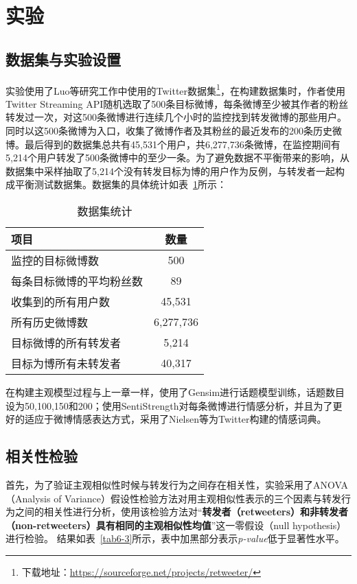 \section{实验}
\label{experiments}

\subsection{数据集与实验设置}
实验使用了Luo等研究工作中使用的Twitter数据集\footnote{下载地址：\url{https://sourceforge.net/projects/retweeter/}}，在构建数据集时，作者使用Twitter Streaming API随机选取了500条目标微博，每条微博至少被其作者的粉丝转发过一次，对这500条微博进行连续几个小时的监控找到转发微博的那些用户。同时以这500条微博为入口，收集了微博作者及其粉丝的最近发布的200条历史微博。最后得到的数据集总共有45,531个用户，共6,277,736条微博，在监控期间有5,214个用户转发了500条微博中的至少一条。为了避免数据不平衡带来的影响，从数据集中采样抽取了5,214个没有转发目标为博的用户作为反例，与转发者一起构成平衡测试数据集。数据集的具体统计如表~\ref{tab6-2}所示：
\begin{table}[htb]
\centering
\caption{数据集统计}
\label{tab6-2}
\begin{tabular}{|l|c|}
\hline
项目 &数量\\
\hline
监控的目标微博数 & 500 \\
\hline
每条目标微博的平均粉丝数 & 89 \\
\hline
收集到的所有用户数 & 45,531 \\
\hline
所有历史微博数 & 6,277,736 \\
\hline
目标微博的所有转发者 & 5,214 \\
\hline
目标为博所有未转发者 & 40,317  \\
\hline
\end{tabular}
\end{table}

在构建主观模型过程与上一章一样，使用了Gensim进行话题模型训练，话题数目设为50,100,150和200；使用SentiStrength对每条微博进行情感分析，并且为了更好的适应于微博情感表达方式，采用了Nielsen等为Twitter构建的情感词典。

\subsection{相关性检验}
首先，为了验证主观相似性时候与转发行为之间存在相关性，实验采用了ANOVA（Analysis of Variance）假设性检验方法对用主观相似性表示的三个因素与转发行为之间的相关性进行分析，使用该检验方法对“\textbf{转发者（retweeters）和非转发者（non-retweeters）具有相同的主观相似性均值}”这一零假设（null hypothesis）进行检验。
结果如表~\ref{tab6-3}所示，表中加黑部分表示\textit{p-value}低于显著性水平。

